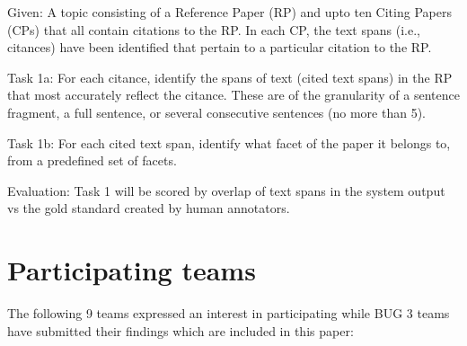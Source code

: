 \documentclass[11pt]{article}
\begin{document}
Given: A topic consisting of a Reference Paper (RP) and upto ten Citing Papers 
(CPs) that all contain citations to the RP. In each CP, the text spans 
(i.e., citances) have been identified that pertain to a particular citation to 
the RP.

Task 1a: For each citance, identify the spans of text (cited text spans) in the 
RP that most accurately reflect the citance. These are of the granularity of a 
sentence fragment, a full sentence, or several consecutive sentences 
(no more than 5).

Task 1b: For each cited text span, identify what facet of the paper it belongs to, 
from a predefined set of facets.

Evaluation: Task 1 will be scored by overlap of text spans in the system output vs 
the gold standard created by human annotators.

\section{Participating teams}
The following 9 teams expressed an interest in participating while BUG 3 teams have 
submitted their findings which are included in this paper:
\end{document}
